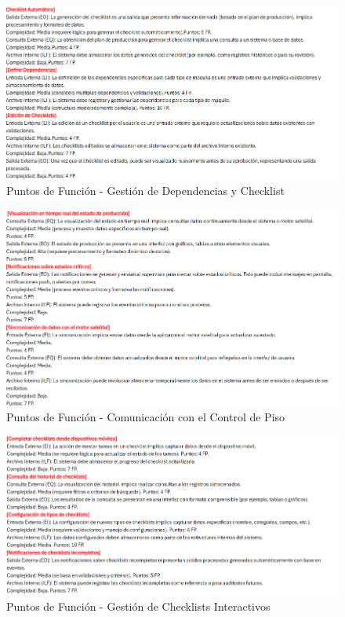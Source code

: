 \documentclass[12pt,letterpaper,spanish, xcolor=table]{report}
\numberwithin{figure}{subsection}
\begin{document}
	\begin{figure}[H]
		\centering
		\includegraphics[width=1.0\textwidth]
		{Imagenes/PathAyuda/FpsDependeciasChecklist.png}
		\caption{Puntos de Función - Gestión de Dependencias y Checklist
		}\label{a2}
	\end{figure}
	
	\begin{figure}[H]
		\centering
		\includegraphics[width=1.0\textwidth]
		{Imagenes/PathAyuda/FpsComunicacionPiso.png}
		\caption{Puntos de Función - Comunicación con el Control de Piso 
		}\label{a2}
	\end{figure}
	
	\begin{figure}[H]
		\centering
		\includegraphics[width=1.0\textwidth]
		{Imagenes/PathAyuda/FpsChecklistsInteractivos.png}
		\caption{Puntos de Función - Gestión de Checklists Interactivos 
		}\label{a2}
	\end{figure}
	
\end{document}
